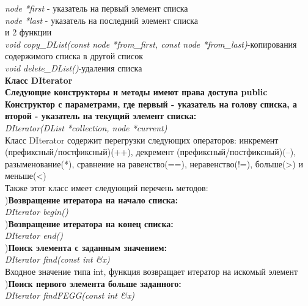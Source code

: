 \documentclass[a4paper]{article}
\begin{document}
{        \hfill\break
        \textit{node *first} - указатель на первый элемент списка\\
        \textit{node *last} - указатель на последний элемент списка\\
        \hfill\break
    и 2 функции\\
        \hfill\break
        \textit{void copy\_DList(const node *from\_first, const node *from\_last)}-копирования содержимого списка в другой список\\
        \textit{void delete\_DList()}-удаления списка\\
    \newpage%
    {\LARGE \bf Класс DIterator }\\
        \hfill\break
    {\bf Следующие конструкторы и методы имеют права доступа public}\\
        \hfill\break
    {\bf Конструктор с параметрами, где первый - указатель на голову списка, а второй - указатель на текущий элемент списка:}\\
        \hfill \break
        \textit{DIterator(DList *collection, node *current)}\\
        \hfill\break
        \hfill\break
    Класс DIterator содержит перегрузки следующих операторов: инкремент (префиксный/постфиксный)(++), декремент (префиксный/постфиксный)(--), разыменование(*), сравнение на равенство(==), неравенство(!=), больше(>) и меньше(<)\\
    Также этот класс имеет следующий перечень методов:\\
        \hfill{}){\bf Возвращение итератора на начало списка:}\\
        \hfill\break
        \textit{DIterator begin()}\\
        \hfill\break
        \hfill{}){\bf Возвращение итератора на конец списка:}\\
        \hfill\break
        \textit{DIterator end()}\\
        \hfill\break
        \hfill{}){\bf Поиск элемента с заданным значением:}\\
        \hfill\break
        \textit{DIterator find(const int \&x)}\\
        \hfill\break
    Входное значение типа int, функция возвращает итератор на искомый элемент\\
        \hfill\break
        \hfill{}){\bf Поиск первого элемента больше заданного:}\\
        \hfill\break
        \textit{DIterator findFEGG(const int \&x)}\\
}
\end{document}
